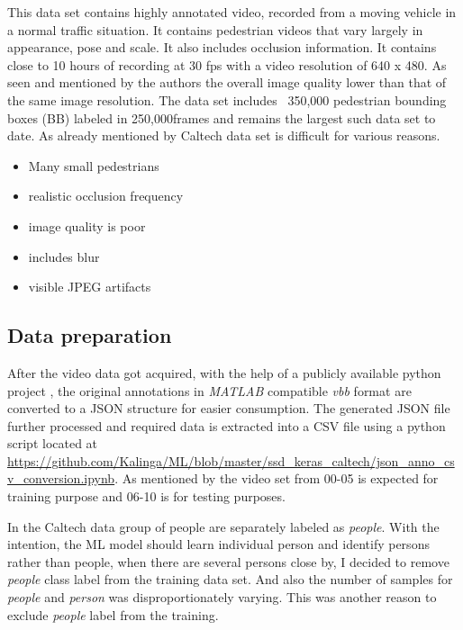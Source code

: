 \newpara
This data set contains highly annotated video, recorded from a moving vehicle in a normal traffic situation. It contains pedestrian videos that vary largely in appearance, pose and scale. It also includes occlusion information. It contains close to 10 hours of recording at 30 fps with a video resolution of 640 x 480. As seen and mentioned by the authors the overall image quality lower than that of the same image resolution. The data set includes ~350,000  pedestrian bounding boxes (BB) labeled in 250,000frames and remains the largest such data set to  date. As already mentioned by \cite{walk2010new} Caltech data set is difficult for various reasons.

\begin{itemize}
	\setlength\itemsep{-1em}
	\item Many small pedestrians
	\item realistic occlusion frequency
	\item image quality is poor
	\item includes blur
	\item visible JPEG artifacts
\end{itemize}

\subsection{Data preparation}
After the video data got acquired, with the help of a publicly available python project \cite{shuntasaito2015}, the original annotations in \textit{MATLAB} compatible \textit{vbb} format are converted to a JSON structure for easier consumption. The generated JSON file further processed and required data is extracted into a CSV file using a python script located at \url{ https://github.com/Kalinga/ML/blob/master/ssd_keras_caltech/json_anno_csv_conversion.ipynb}. As mentioned by \cite{dollar2009pedestrian} the video set from 00-05 is expected for training purpose and 06-10 is for testing purposes.

In the Caltech data group of people are separately labeled as \textit{people}. With the intention, the ML model should learn individual person and identify persons rather than people, when there are several persons close by, I decided to remove \textit{people} class label from the training data set. And also the number of samples for \textit{people} and \textit{person} was disproportionately varying. This was another reason to exclude \textit{people }label from  the training. 

